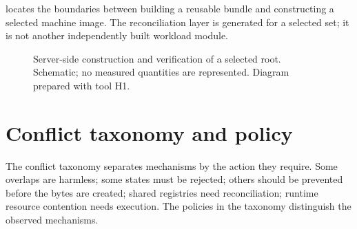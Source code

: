  locates the boundaries between building a reusable bundle and constructing a selected machine image. The reconciliation layer is generated for a selected set; it is not another independently built workload module.
\begin{figure}[tbp]
\centering
{}
\caption{Server-side construction and verification of a selected root. Schematic; no measured quantities are represented. Diagram prepared with tool H1.}
\label{fig:architecture}
\end{figure}

\section{Conflict taxonomy and policy}
\label{sec:arch:taxonomy}

The conflict taxonomy separates mechanisms by the action they require. Some overlaps are harmless; some states must be rejected; others should be prevented before the bytes are created; shared registries need reconciliation; runtime resource contention needs execution. The policies in the taxonomy distinguish the observed mechanisms.

